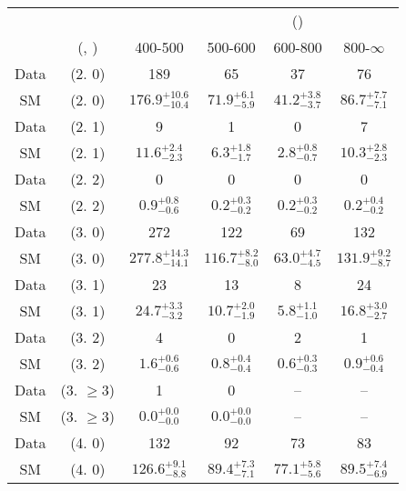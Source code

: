 \begin{table}[h!]
\tiny
\centering
{}
\begin{tabular}
{cccccc}
	\hline\hline
&	&	& \multicolumn{4}{c}{\scalht (\gev)}\\ 
	&	 (\njet, \nb) & 400-500 & 500-600 & 600-800 & 800-$\infty$ \\ [0.8ex] 
\hline
	Data & (2. 0) & 189 & 65 & 37 & 76 \\[0.5ex] 
	SM & (2. 0) & $176.9^{+ 10.6 }_{- 10.4 }$ & $71.9^{+ 6.1 }_{- 5.9 }$ & $41.2^{+ 3.8 }_{- 3.7 }$ & $86.7^{+ 7.7 }_{- 7.1 }$ \\[0.5ex] 
	Data & (2. 1) & 9 & 1 & 0 & 7 \\[0.5ex] 
	SM & (2. 1) & $11.6^{+ 2.4 }_{- 2.3 }$ & $6.3^{+ 1.8 }_{- 1.7 }$ & $2.8^{+ 0.8 }_{- 0.7 }$ & $10.3^{+ 2.8 }_{- 2.3 }$ \\[0.5ex] 
	Data & (2. 2) & 0 & 0 & 0 & 0 \\[0.5ex] 
	SM & (2. 2) & $0.9^{+ 0.8 }_{- 0.6 }$ & $0.2^{+ 0.3 }_{- 0.2 }$ & $0.2^{+ 0.3 }_{- 0.2 }$ & $0.2^{+ 0.4 }_{- 0.2 }$ \\[0.5ex] 
	Data & (3. 0) & 272 & 122 & 69 & 132 \\[0.5ex] 
	SM & (3. 0) & $277.8^{+ 14.3 }_{- 14.1 }$ & $116.7^{+ 8.2 }_{- 8.0 }$ & $63.0^{+ 4.7 }_{- 4.5 }$ & $131.9^{+ 9.2 }_{- 8.7 }$ \\[0.5ex] 
	Data & (3. 1) & 23 & 13 & 8 & 24 \\[0.5ex] 
	SM & (3. 1) & $24.7^{+ 3.3 }_{- 3.2 }$ & $10.7^{+ 2.0 }_{- 1.9 }$ & $5.8^{+ 1.1 }_{- 1.0 }$ & $16.8^{+ 3.0 }_{- 2.7 }$ \\[0.5ex] 
	Data & (3. 2) & 4 & 0 & 2 & 1 \\[0.5ex] 
	SM & (3. 2) & $1.6^{+ 0.6 }_{- 0.6 }$ & $0.8^{+ 0.4 }_{- 0.4 }$ & $0.6^{+ 0.3 }_{- 0.3 }$ & $0.9^{+ 0.6 }_{- 0.4 }$ \\[0.5ex] 
	Data & (3. $\ge3$) & 1 & 0 & -- & -- \\[0.5ex] 
	SM & (3. $\ge3$) & $0.0^{+ 0.0 }_{- 0.0 }$ & $0.0^{+ 0.0 }_{- 0.0 }$ & -- & -- \\[0.5ex] 
	Data & (4. 0) & 132 & 92 & 73 & 83 \\[0.5ex] 
	SM & (4. 0) & $126.6^{+ 9.1 }_{- 8.8 }$ & $89.4^{+ 7.3 }_{- 7.1 }$ & $77.1^{+ 5.8 }_{- 5.6 }$ & $89.5^{+ 7.4 }_{- 6.9 }$ \\[0.5ex] 

\end{tabular}
\end{table}

